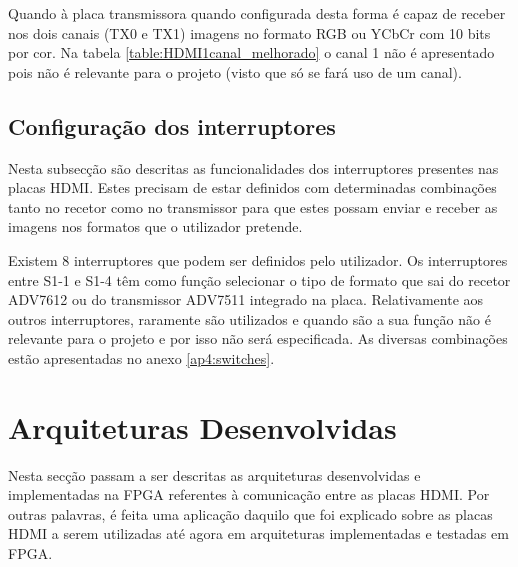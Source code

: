 Quando à placa transmissora quando configurada desta forma é capaz de receber nos dois canais (TX0 e TX1) imagens no formato RGB ou YCbCr com 10 bits por cor. Na tabela \ref{table:HDMI1canal_melhorado} o canal 1 não é apresentado pois não é relevante para o projeto (visto que só se fará uso de um canal).

\subsection{Configuração dos interruptores}

Nesta subsecção são descritas as funcionalidades dos interruptores presentes nas placas HDMI. Estes precisam de estar definidos com determinadas combinações tanto no recetor como no transmissor para que estes possam enviar e receber as imagens nos formatos que o utilizador pretende.

Existem 8 interruptores que podem ser definidos pelo utilizador. Os interruptores entre S1-1 e S1-4 têm como função selecionar o tipo de formato que sai do recetor ADV7612 ou do transmissor ADV7511 integrado na placa. Relativamente aos outros interruptores, raramente são utilizados e quando são a sua função não é relevante para o projeto e por isso não será especificada. As diversas combinações estão apresentadas no anexo \ref{ap4:switches}.


\section{Arquiteturas Desenvolvidas} \label{sec:HDMIarquiteturas}

Nesta secção passam a ser descritas as arquiteturas desenvolvidas e implementadas na FPGA referentes à comunicação entre as placas HDMI.  Por outras palavras, é feita uma aplicação daquilo que foi explicado sobre as placas HDMI a serem utilizadas até agora em arquiteturas implementadas e testadas em FPGA.

